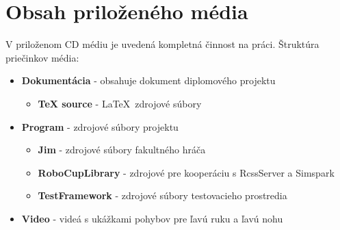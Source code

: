 \section{Obsah priloženého média}
	\label{appendix_medium}
	
V priloženom CD médiu je uvedená kompletná činnost na práci.
Štruktúra priečinkov média:

\begin{itemize}
	\item \textbf{Dokumentácia} - obsahuje dokument diplomového projektu
	\begin{itemize}
		\item \textbf{TeX source} - \LaTeX ~zdrojové súbory
	\end{itemize}
	\item \textbf{Program} - zdrojové súbory projektu
	\begin{itemize}
		\item \textbf{Jim} - zdrojové súbory fakultného hráča
		\item \textbf{RoboCupLibrary} - zdrojové pre kooperáciu s RcssServer a Simspark
		\item \textbf{TestFramework} - zdrojové súbory testovacieho prostredia
	\end{itemize}
	\item \textbf{Video} - videá s ukážkami pohybov pre ľavú ruku a ľavú nohu
\end{itemize}